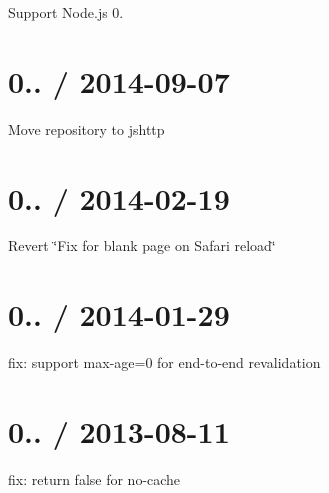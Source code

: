 
\begin{DoxyItemize}
\item Support Node.\+js 0.
\end{DoxyItemize}

\section*{0.. / 2014-\/09-\/07 }


\begin{DoxyItemize}
\item Move repository to jshttp
\end{DoxyItemize}

\section*{0.. / 2014-\/02-\/19 }


\begin{DoxyItemize}
\item Revert \char`\"{}\+Fix for blank page on Safari reload\char`\"{}
\end{DoxyItemize}

\section*{0.. / 2014-\/01-\/29 }


\begin{DoxyItemize}
\item fix\+: support max-\/age=0 for end-\/to-\/end revalidation
\end{DoxyItemize}

\section*{0.. / 2013-\/08-\/11 }


\begin{DoxyItemize}
\item fix\+: return false for no-\/cache 
\end{DoxyItemize}